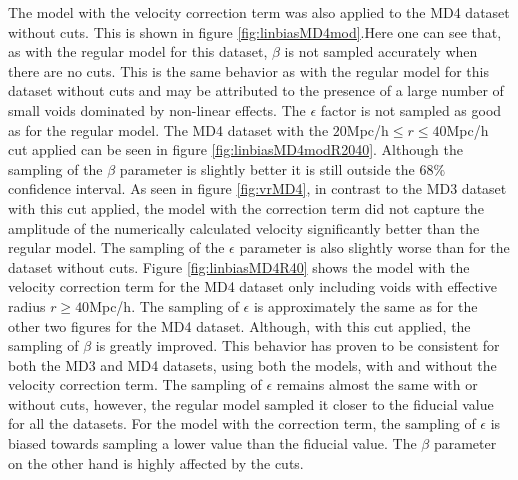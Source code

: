 The model with the velocity correction term was also applied to the MD4 dataset without cuts. This is shown in figure \ref{fig:linbiasMD4mod}.Here one can see that, as with the regular model for this dataset, $\beta$ is not sampled accurately when there are no cuts. 
This is the same behavior as with the regular model for this dataset without cuts and may be attributed to the presence of a large number of small voids dominated by non-linear effects. The $\epsilon$ factor is not sampled as good as for the regular model. The MD4 dataset with the $20$Mpc/h$\leq r\leq 40$Mpc/h cut applied can be seen in figure \ref{fig:linbiasMD4modR2040}. Although the sampling of the $\beta$ parameter is slightly better it is still outside the $68\%$ confidence interval. As seen in figure \ref{fig:vrMD4}, in contrast to the MD3 dataset with this cut applied, the model with the correction term did not capture the amplitude of the numerically calculated velocity significantly better than the regular model. The sampling of the $\epsilon$ parameter is also slightly worse than for the dataset without cuts. Figure \ref{fig:linbiasMD4R40} shows the model with the velocity correction term for the MD4 dataset only including voids with effective radius $r\geq 40$Mpc/h. The sampling of $\epsilon$ is approximately the same as for the other two figures for the MD4 dataset. Although, with this cut applied, the sampling of $\beta$ is greatly improved. This behavior has proven to be consistent for both the MD3 and MD4 datasets, using both the models, with and without the velocity correction term. The sampling of $\epsilon$ remains almost the same with or without cuts, however, the regular model sampled it closer to the fiducial value for all the datasets. For the model with the correction term, the sampling of $\epsilon$ is biased towards sampling a lower value than the fiducial value. The $\beta$ parameter on the other hand is highly affected by the cuts.

